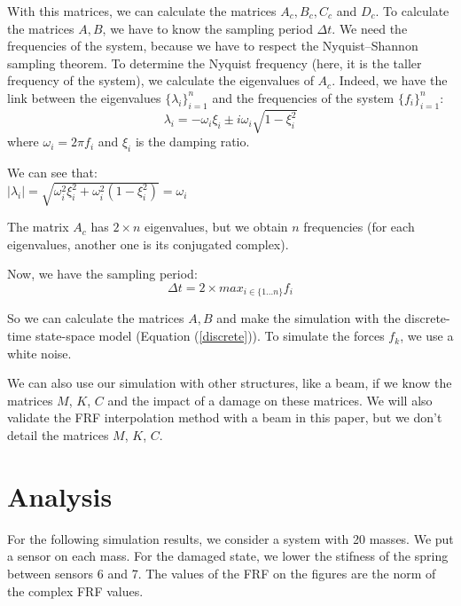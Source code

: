 \documentclass[journal]{IEEEtran}
\begin{document}
With this matrices, we can calculate the matrices $A_c, B_c, C_c$ and $D_c$. To calculate the matrices $A, B$, we have to know the 
sampling period $\Delta t$. We need the frequencies of the system, because we have to respect the Nyquist–Shannon sampling theorem.
To determine the Nyquist frequency (here, it is the taller frequency of the system), we calculate the eigenvalues of $A_c$. Indeed, we have the link between the eigenvalues $\{\lambda_i\}_{i=1}^n$ and the frequencies of the system $\{f_i\}_{i=1}^n$:
\begin{equation}
\lambda_i = - \omega_i \xi_i \pm i \omega_i \sqrt{1 - \xi_i^2}
\end{equation}
where $\omega_i = 2 \pi f_i$ and $\xi_i$ is the damping ratio.

\begin{remark}
We can see that:\\
$|\lambda_i| = \sqrt{\omega_i^2 \xi_i^2 + \omega_i^2 (1 - \xi_i^2)} = \omega_i$
\end{remark}

\begin{remark}
The matrix $A_c$ has $2 \times n$ eigenvalues, but we obtain $n$ frequencies (for each eigenvalues, another one is its conjugated complex). 
\end{remark}

Now, we have the sampling period:
\begin{equation}
\Delta t = 2 \times max_{i \in \{1 ... n\} } f_i
\end{equation}

So we can calculate the matrices $A, B$ and make the simulation with the discrete-time state-space model (Equation (\ref{discrete})). To simulate the forces $f_k$, we use a white noise.


We can also use our simulation with other structures, like a beam, if we know the matrices $M$, $K$, $C$ and the impact of a damage on these matrices.
We will also validate the FRF interpolation method with a beam in this paper, but we don't detail the matrices $M$, $K$, $C$.


\section{Analysis}

For the following simulation results, we consider a system with 20 masses. We put a sensor on each mass. For the damaged state, we lower the stifness of the spring between sensors 6 and 7. The values of the FRF on the figures are the norm of the complex FRF values.
\end{document}
